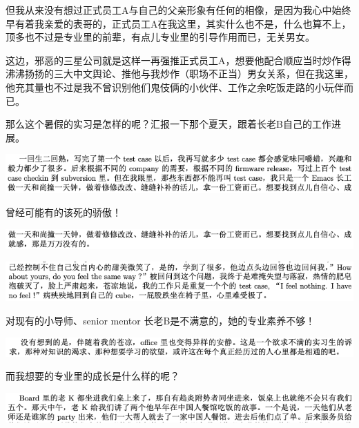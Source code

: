 \documentclass[9pt, b5paper]{article}
\begin{document}
但我从来没有想过正式员工A与自己的父亲形象有任何的相像，是因为我心中始终早有着我亲爱的表哥的，正式员工A在我这里，其实什么也不是，什么也算不上，顶多也不过是专业里的前辈，有点儿专业里的引导作用而已，无关男女。

这边，邪恶的三星公司就是这样一再强推正式员工A，想要他配合顺应当时炒作得沸沸扬扬的三大中文舆论、推他与我炒作（职场不正当）男女关系，但在我这里，他充其量也不过是我不曾识别他们鬼伎俩的小伙伴、工作之余吃饭走路的小玩伴而已。

那么这个暑假的实习是怎样的呢？汇报一下那个夏天，跟着长老B自己的工作进展。

\begin{center}
\includegraphics[width=.9\linewidth]{./pic/backups_plans_20210508_092647.png}
\end{center}

曾经可能有的该死的骄傲！

\begin{center}
\includegraphics[width=.9\linewidth]{./pic/backups_plans_20210508_092922.png}
\end{center}

\begin{center}
\includegraphics[width=.9\linewidth]{./pic/backups_plans_20210508_092948.png}
\end{center}

对现有的小导师、senior mentor 长老B是不满意的，她的专业素养不够！

\begin{center}
\includegraphics[width=.9\linewidth]{./pic/backups_plans_20210508_093010.png}
\end{center}

而我想要的专业里的成长是什么样的呢？

\begin{center}
\includegraphics[width=.9\linewidth]{./pic/backups_plans_20210508_093152.png}
\end{center}
\end{document}
